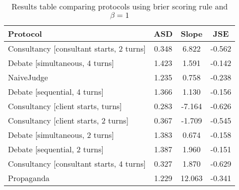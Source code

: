 \begin{table}[h]
\centering
\begin{tabular}{lccc}
\toprule
Protocol & ASD & Slope & JSE \\
\midrule
Consultancy [consultant starts, 2 turns] & 0.348 & 6.822 & -0.562 \\
Debate [simultaneous, 4 turns] & 1.423 & 1.591 & -0.142 \\
NaiveJudge & 1.235 & 0.758 & -0.238 \\
Debate [sequential, 4 turns] & 1.366 & 1.130 & -0.156 \\
Consultancy [client starts, turns] & 0.283 & -7.164 & -0.626 \\
Consultancy [client starts, 2 turns] & 0.367 & -1.709 & -0.545 \\
Debate [simultaneous, 2 turns] & 1.383 & 0.674 & -0.158 \\
Debate [sequential, 2 turns] & 1.387 & 1.960 & -0.151 \\
Consultancy [consultant starts, 4 turns] & 0.327 & 1.870 & -0.629 \\
Propaganda & 1.229 & 12.063 & -0.341 \\
\bottomrule
\end{tabular}
\caption{Results table comparing protocols using brier scoring rule and $\beta=1$}
\label{tab:protocol-comparison}
\end{table}